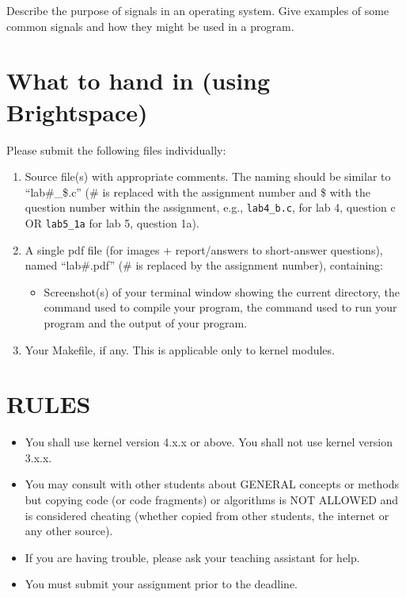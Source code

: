 \documentclass{article}
\begin{document}
Describe the purpose of signals in an operating system. Give examples of some common signals and how they might be used in a program.


\section*{What to hand in (using Brightspace)}

Please submit the following files individually:

\begin{enumerate}
    \item Source file(s) with appropriate comments. The naming should be similar to “lab\#\_\$.c” (\# is replaced with the assignment number and \$ with the question number within the assignment, e.g., \texttt{lab4\_b.c}, for lab 4, question c OR \texttt{lab5\_1a} for lab 5, question 1a).
    \item A single pdf file (for images + report/answers to short-answer questions), named “lab\#.pdf” (\# is replaced by the assignment number), containing:
    \begin{itemize}
        \item Screenshot(s) of your terminal window showing the current directory, the command used to compile your program, the command used to run your program and the output of your program.
    \end{itemize}
    \item Your Makefile, if any. This is applicable only to kernel modules.
\end{enumerate}


\section*{RULES}

\begin{itemize}
    \item You shall use kernel version 4.x.x or above. You shall not use kernel version 3.x.x.
    \item You may consult with other students about GENERAL concepts or methods but copying code (or code fragments) or algorithms is NOT ALLOWED and is considered cheating (whether copied from other students, the internet or any other source).
    \item If you are having trouble, please ask your teaching assistant for help.
    \item You must submit your assignment prior to the deadline.
\end{itemize}
\end{document}
